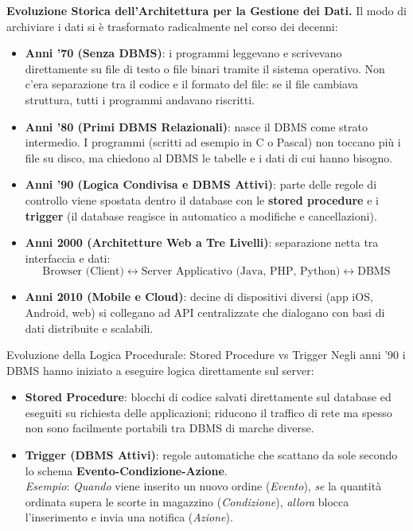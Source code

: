 \documentclass[12pt]{extarticle}
\begin{document}
\medskip
\noindent \textbf{Evoluzione Storica dell'Architettura per la Gestione dei Dati.} Il modo di archiviare i dati si è trasformato radicalmente nel corso dei decenni:
\begin{itemize}
    \item \textbf{Anni '70 (Senza DBMS)}: i programmi leggevano e scrivevano direttamente su file di testo o file binari tramite il sistema operativo. Non c'era separazione tra il codice e il formato del file: se il file cambiava struttura, tutti i programmi andavano riscritti.
    \item \textbf{Anni '80 (Primi DBMS Relazionali)}: nasce il DBMS come strato intermedio. I programmi (scritti ad esempio in C o Pascal) non toccano più i file su disco, ma chiedono al DBMS le tabelle e i dati di cui hanno bisogno.
    \item \textbf{Anni '90 (Logica Condivisa e DBMS Attivi)}: parte delle regole di controllo viene spostata dentro il database con le \textbf{stored procedure} e i \textbf{trigger} (il database reagisce in automatico a modifiche e cancellazioni).
    \item \textbf{Anni 2000 (Architetture Web a Tre Livelli)}: separazione netta tra interfaccia e dati:
    $$\text{Browser (Client)} \longleftrightarrow \text{Server Applicativo (Java, PHP, Python)} \longleftrightarrow \text{DBMS}$$
    \item \textbf{Anni 2010 (Mobile e Cloud)}: decine di dispositivi diversi (app iOS, Android, web) si collegano ad API centralizzate che dialogano con basi di dati distribuite e scalabili.
\end{itemize}

\begin{cbox}{Evoluzione della Logica Procedurale: Stored Procedure vs Trigger}
\noindent Negli anni '90 i DBMS hanno iniziato a eseguire logica direttamente sul server:
\begin{itemize}
    \item \textbf{Stored Procedure}: blocchi di codice salvati direttamente sul database ed eseguiti su richiesta delle applicazioni; riducono il traffico di rete ma spesso non sono facilmente portabili tra DBMS di marche diverse.
    \item \textbf{Trigger (DBMS Attivi)}: regole automatiche che scattano da sole secondo lo schema \textbf{Evento-Condizione-Azione}. \\
    \textit{Esempio}: \textit{Quando} viene inserito un nuovo ordine (\textit{Evento}), \textit{se} la quantità ordinata supera le scorte in magazzino (\textit{Condizione}), \textit{allora} blocca l'inserimento e invia una notifica (\textit{Azione}).
\end{itemize}
\end{cbox}
\end{document}
